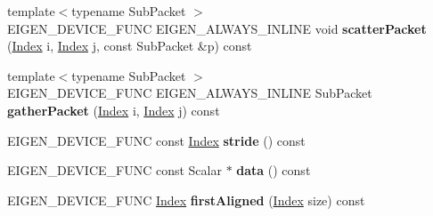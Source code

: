 \begin{DoxyCompactItemize}
\mbox{\label{class_eigen_1_1internal_1_1blas__data__mapper_a026a62809b2eff9e14ccc8c22b26e5f0}} 
{\footnotesize template$<$typename Sub\+Packet $>$ }\\E\+I\+G\+E\+N\+\_\+\+D\+E\+V\+I\+C\+E\+\_\+\+F\+U\+NC E\+I\+G\+E\+N\+\_\+\+A\+L\+W\+A\+Y\+S\+\_\+\+I\+N\+L\+I\+NE void {\bfseries scatter\+Packet} (\hyperlink{namespace_eigen_a62e77e0933482dafde8fe197d9a2cfde}{Index} i, \hyperlink{namespace_eigen_a62e77e0933482dafde8fe197d9a2cfde}{Index} j, const Sub\+Packet \&p) const
\item 
\mbox{\label{class_eigen_1_1internal_1_1blas__data__mapper_ae947afd5dceca7c8f1d5c5f054e2ffcf}} 
{\footnotesize template$<$typename Sub\+Packet $>$ }\\E\+I\+G\+E\+N\+\_\+\+D\+E\+V\+I\+C\+E\+\_\+\+F\+U\+NC E\+I\+G\+E\+N\+\_\+\+A\+L\+W\+A\+Y\+S\+\_\+\+I\+N\+L\+I\+NE Sub\+Packet {\bfseries gather\+Packet} (\hyperlink{namespace_eigen_a62e77e0933482dafde8fe197d9a2cfde}{Index} i, \hyperlink{namespace_eigen_a62e77e0933482dafde8fe197d9a2cfde}{Index} j) const
\item 
\mbox{\label{class_eigen_1_1internal_1_1blas__data__mapper_a3303085bf92397158e10f0c9fd217754}} 
E\+I\+G\+E\+N\+\_\+\+D\+E\+V\+I\+C\+E\+\_\+\+F\+U\+NC const \hyperlink{namespace_eigen_a62e77e0933482dafde8fe197d9a2cfde}{Index} {\bfseries stride} () const
\item 
\mbox{\label{class_eigen_1_1internal_1_1blas__data__mapper_a772b5c873d654e3937f244722bd20bb3}} 
E\+I\+G\+E\+N\+\_\+\+D\+E\+V\+I\+C\+E\+\_\+\+F\+U\+NC const Scalar $\ast$ {\bfseries data} () const
\item 
\mbox{\label{class_eigen_1_1internal_1_1blas__data__mapper_a45b684d956b18a77fa5a1e4d84e7cd26}} 
E\+I\+G\+E\+N\+\_\+\+D\+E\+V\+I\+C\+E\+\_\+\+F\+U\+NC \hyperlink{namespace_eigen_a62e77e0933482dafde8fe197d9a2cfde}{Index} {\bfseries first\+Aligned} (\hyperlink{namespace_eigen_a62e77e0933482dafde8fe197d9a2cfde}{Index} size) const
\end{DoxyCompactItemize}
